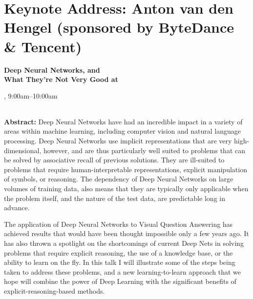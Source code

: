 \section{Keynote Address: Anton van den Hengel (sponsored by ByteDance \& Tencent)}

\begin{center}
\begin{Large}
  {\bfseries\Large Deep Neural Networks, and\\What They’re Not Very Good at} \vspace{1em}\par
\end{Large}


\daydateyear, 9:00am--10:00am \vspace{1em}\\
\PlenaryLoc \\
\vspace{1em}\par
\end{center}

\noindent

{\bf Abstract:} Deep Neural Networks have had an incredible impact in a variety of areas within machine learning, including computer vision and natural language processing. Deep Neural Networks use implicit representations that are very high-dimensional, however, and are thus particularly well suited to problems that can be solved by associative recall of previous solutions. They are ill-suited to problems that require human-interpretable representations, explicit manipulation of symbols, or reasoning. The dependency of Deep Neural Networks on large volumes of training data, also means that they are typically only applicable when the problem itself, and the nature of the test data, are predictable long in advance.

The application of Deep Neural Networks to Visual Question Answering has achieved results that would have been thought impossible only a few years ago. It has also thrown a spotlight on the shortcomings of current Deep Nets in solving problems that require explicit reasoning, the use of a knowledge base, or the ability to learn on the fly. In this talk I will illustrate some of the steps being taken to address these problems, and a new learning-to-learn approach that we hope will combine the power of Deep Learning with the significant benefits of explicit-reasoning-based methods.



